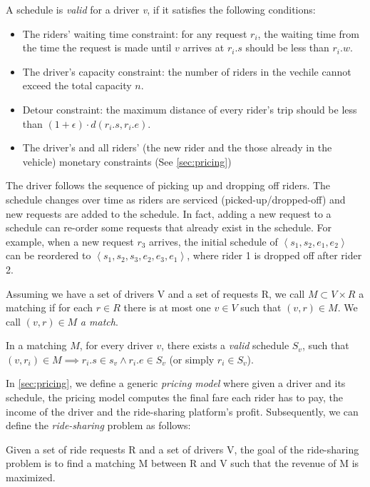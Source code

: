 A schedule is \textit{valid} for a driver \textit{v}, if it satisfies the following conditions:

\begin{itemize}
\item The riders' waiting time constraint: for any request $r_i$, the waiting time from the time the request is made until $v$ arrives at $r_i.s$ should be less than $r_i.w$.
\item The driver's capacity constraint: the number of riders in the vechile cannot exceed the total capacity $n$.
\item Detour constraint: the maximum distance of every rider's trip should be less than $(1+\epsilon) \cdot d(r_i.s, r_i.e)$.
\item The driver's and all riders' (the new rider and the those already in the vehicle) monetary constraints (See \cref{sec:pricing})
\end{itemize}

The driver follows the sequence of picking up and dropping off riders. The schedule changes over time as riders are serviced (picked-up/dropped-off) and new requests are added to the schedule. In fact, adding a new request to a schedule can re-order some requests that already exist in the schedule. For example, when a new request $r_3$ arrives, the initial schedule of $\left\langle s_1, s_2, e_1, e_2 \right\rangle$ can be reordered to $\left\langle s_1, s_2, s_3, e_2, e_3, e_1 \right\rangle$, where rider 1 is dropped off after rider 2.

\begin{definition} [Matching]
Assuming we have a set of drivers V and a set of requests R, we call $M \subset V \times R$ a matching if for each $r \in R$ there is at most one $v \in V$ such that $\left( v, r \right) \in M$. We call $\left( v, r \right) \in M$ \emph{a match}.
\end{definition}

\noindent In a matching $M$, for every driver $v$, there exists a \textit{valid} schedule $S_v$, such that $(v, r_i) \in M \implies r_i.s \in s_v \wedge r_i.e \in S_v$ (or simply $r_i \in S_v$). 

In \cref{sec:pricing}, we define a generic \textit{pricing model} where given a driver and its schedule, the pricing model computes the final fare each rider has to pay, the income of the driver and the ride-sharing platform's profit. Subsequently, we can define the \textit{ride-sharing} problem as follows:

\begin{definition} 
Given a set of ride requests R and a set of drivers V, the goal of the ride-sharing problem is to find a matching M between R and V such that the revenue of M is maximized.
\end{definition}

